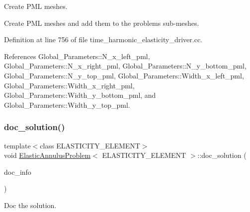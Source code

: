 Create P\+ML meshes. 

Create P\+ML meshes and add them to the problem\textquotesingle{}s sub-\/meshes. 

Definition at line 756 of file time\+\_\+harmonic\+\_\+elasticity\+\_\+driver.\+cc.



References Global\+\_\+\+Parameters\+::\+N\+\_\+x\+\_\+left\+\_\+pml, Global\+\_\+\+Parameters\+::\+N\+\_\+x\+\_\+right\+\_\+pml, Global\+\_\+\+Parameters\+::\+N\+\_\+y\+\_\+bottom\+\_\+pml, Global\+\_\+\+Parameters\+::\+N\+\_\+y\+\_\+top\+\_\+pml, Global\+\_\+\+Parameters\+::\+Width\+\_\+x\+\_\+left\+\_\+pml, Global\+\_\+\+Parameters\+::\+Width\+\_\+x\+\_\+right\+\_\+pml, Global\+\_\+\+Parameters\+::\+Width\+\_\+y\+\_\+bottom\+\_\+pml, and Global\+\_\+\+Parameters\+::\+Width\+\_\+y\+\_\+top\+\_\+pml.

\mbox{\label{classElasticAnnulusProblem_ab2952a8591047f62f9f66cfe29a533de}} 
\subsubsection{\texorpdfstring{doc\+\_\+solution()}{doc\_solution()}\hspace{0.1cm}{\footnotesize\ttfamily [1/2]}}
{\footnotesize\ttfamily template$<$class E\+L\+A\+S\+T\+I\+C\+I\+T\+Y\+\_\+\+E\+L\+E\+M\+E\+NT$>$ \\
void \hyperlink{classElasticAnnulusProblem}{Elastic\+Annulus\+Problem}$<$ E\+L\+A\+S\+T\+I\+C\+I\+T\+Y\+\_\+\+E\+L\+E\+M\+E\+NT $>$\+::doc\+\_\+solution (\begin{DoxyParamCaption}\item[{Doc\+Info \&}]{doc\+\_\+info }\end{DoxyParamCaption})}



Doc the solution. 

\mbox{\label{classElasticAnnulusProblem_ab2952a8591047f62f9f66cfe29a533de}} 
